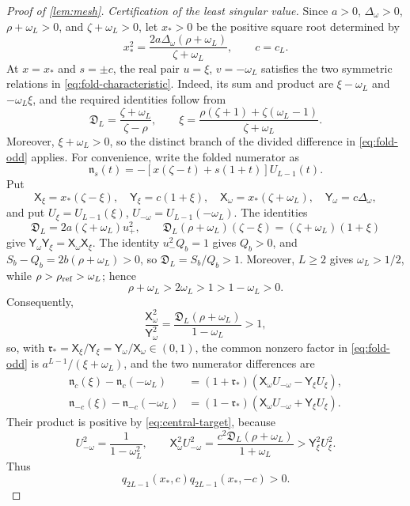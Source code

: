 \documentclass[review,hidelinks,onefignum,onetabnum]{siamart251216}
\begin{document}
\begin{proof}[Proof of \cref{lem:mesh}]
\medskip\noindent\emph{Certification of the least singular value.}\quad
Since \(a>0\), \(\Delta_\omega>0\), \(\rho+\omega_L>0\), and
\(\zeta+\omega_L>0\), let \(x_*>0\) be the positive square root determined
by
\begin{equation}\label{eq:x-star-central}
 x_*^2=\frac{2a\Delta_\omega(\rho+\omega_L)}{\zeta+\omega_L},
 \qquad c=c_L.
\end{equation}
At \(x=x_*\) and \(s=\pm c\), the real pair
\(u=\xi\), \(v=-\omega_L\) satisfies the two symmetric relations in
\eqref{eq:fold-characteristic}.  Indeed, its sum and product are
\(\xi-\omega_L\) and \(-\omega_L\xi\), and the required identities
follow from
\[
 \mathfrak D_L=\frac{\zeta+\omega_L}{\zeta-\rho},\qquad
 \xi=\frac{\rho(\zeta+1)+\zeta(\omega_L-1)}{\zeta+\omega_L}.
\]
Moreover, \(\xi+\omega_L>0\), so the distinct branch of the divided
difference in \eqref{eq:fold-odd} applies.
For convenience, write the folded numerator as
\[
 \mathfrak n_s(t)=-[x(\zeta-t)+s(1+t)]U_{L-1}(t).
\]
Put
\[
 \mathsf{X}_\xi=x_*(\zeta-\xi),\quad
 \mathsf{Y}_\xi=c(1+\xi),\quad
 \mathsf{X}_\omega=x_*(\zeta+\omega_L),\quad
 \mathsf{Y}_\omega=c\Delta_\omega,
\]
and put
\(U_\xi=U_{L-1}(\xi)\),
\(U_{-\omega}=U_{L-1}(-\omega_L)\).  The identities
\[
 \mathfrak D_L=2a(\zeta+\omega_L)u_+^2,\qquad
 \mathfrak D_L(\rho+\omega_L)(\zeta-\xi)
 =(\zeta+\omega_L)(1+\xi)
\]
give
\(\mathsf{Y}_\omega\mathsf{Y}_\xi
=\mathsf{X}_\omega\mathsf{X}_\xi\).  The identity \(u_-^2Q_b=1\) gives
\(Q_b>0\), and \(S_b-Q_b=2b(\rho+\omega_L)>0\), so
\(\mathfrak D_L=S_b/Q_b>1\).  Moreover, \(L\geq2\) gives
\(\omega_L>1/2\), while \(\rho>\rho_{\rm ref}>\omega_L\); hence
\[
 \rho+\omega_L>2\omega_L>1>1-\omega_L>0.
\]
Consequently,
\[
 \frac{\mathsf{X}_\omega^2}{\mathsf{Y}_\omega^2}
 =\frac{\mathfrak D_L(\rho+\omega_L)}{1-\omega_L}>1,
\]
so, with
\(\mathfrak r_*=\mathsf{X}_\xi/\mathsf{Y}_\xi
=\mathsf{Y}_\omega/\mathsf{X}_\omega\in(0,1)\), the common nonzero factor
in \eqref{eq:fold-odd} is \(a^{L-1}/(\xi+\omega_L)\), and the two numerator
differences are
\[
\begin{aligned}
 \mathfrak n_c(\xi)-\mathfrak n_c(-\omega_L)
  &=(1+\mathfrak r_*)
    (\mathsf{X}_\omega U_{-\omega}-\mathsf{Y}_\xi U_\xi),\\
 \mathfrak n_{-c}(\xi)-\mathfrak n_{-c}(-\omega_L)
  &=(1-\mathfrak r_*)
    (\mathsf{X}_\omega U_{-\omega}+\mathsf{Y}_\xi U_\xi).
\end{aligned}
\]
Their product is positive by \eqref{eq:central-target}, because
\[
 U_{-\omega}^2=\frac1{1-\omega_L^2},\qquad
 \mathsf{X}_\omega^2U_{-\omega}^2
 =\frac{c^2\mathfrak D_L(\rho+\omega_L)}{1+\omega_L}
 >\mathsf{Y}_\xi^2U_\xi^2.
\]
Thus
\begin{equation}\label{eq:q-product-central}
 q_{2L-1}(x_*,c)q_{2L-1}(x_*,-c)>0.
\end{equation}


\end{proof}
\end{document}
